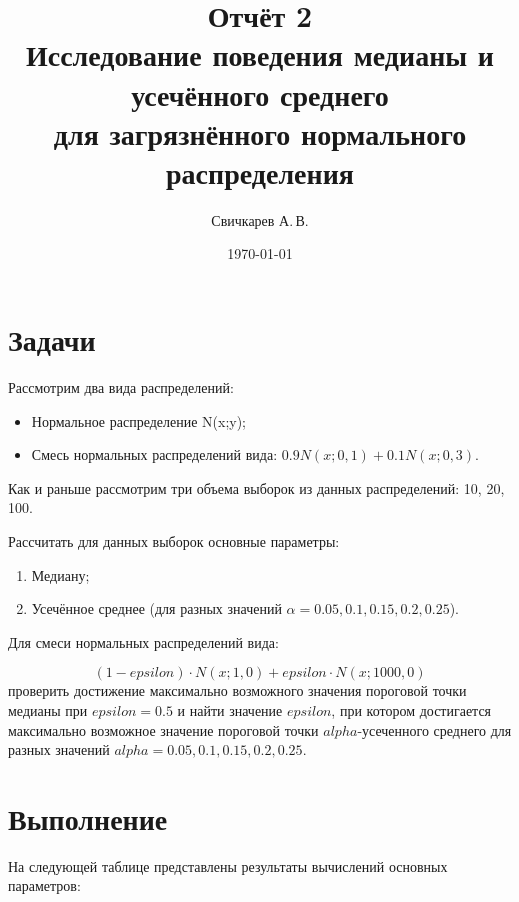 \documentclass{article} %
\title{Отчёт 2\\
Исследование поведения медианы и усечённого среднего\\
для загрязнённого нормального распределения} %
\author{Свичкарев А.\,В.} %
\date{\today} %
\begin{document}

\maketitle %

\section*{Задачи}
Рассмотрим два вида распределений:
\begin{itemize}
    \item Нормальное распределение N(x;y);
    \item Смесь нормальных распределений вида: $0.9 N(x;0,1) + 0.1 N(x;0,3)$.
\end{itemize}

Как и раньше рассмотрим три объема выборок из данных распределений:
10, 20, 100. 
\bigskip

Рассчитать для данных выборок основные параметры:
\begin{enumerate}
    \item Медиану;
    \item Усечённое среднее
        (для разных значений $\alpha = 0.05, 0.1, 0.15, 0.2, 0.25$).
\end{enumerate}

Для смеси нормальных распределений вида:

\begin{equation*}
(1-epsilon) \cdot N(x;1,0) + epsilon \cdot N(x;1000,0)
\end{equation*}
проверить достижение максимально возможного значения
пороговой точки медианы при $epsilon = 0.5$
и найти значение $epsilon$,
при котором достигается максимально возможное значение
пороговой точки $alpha$-усеченного среднего
для разных значений
$alpha = 0.05, 0.1, 0.15, 0.2, 0.25$.

\section*{Выполнение}

На следующей таблице представлены результаты вычислений
основных параметров:
\end{document}
